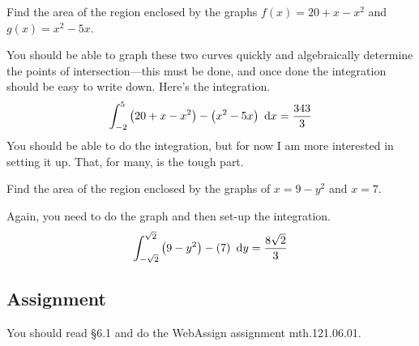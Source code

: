 \documentclass[12pt,addpoints, answers, fleqn]{exam}
\begin{document}
\begin{questions}
\question Find the area of the region enclosed by the graphs $f\left(x\right) = 20 + x - x^2$  and  $g\left(x\right) = x^2 - 5x$.
\begin{solution}
You should be able to graph these two curves quickly and algebraically determine the points of intersection---this must be done, and once done the integration should be easy to write down. Here's the integration.
\begin{eqnarray*}
\int_{-2}^5 \left(20 + x - x^2 \right) - \left(x^2-5x \right) \ {\rm{d}} x = \frac{343}{3}
\end{eqnarray*}
You should be able to do the integration, but for now I am more interested in setting it up. That, for many, is the tough part.
\end{solution}

\question Find the area of the region enclosed by the graphs of $x = 9 - y^2$ and $x = 7$.

\begin{solution}
Again, you need to do the graph and then set-up the integration.
\begin{eqnarray*}
\int_{-\sqrt{2}}^{\sqrt{2}} \left(9-y^2 \right) - \left(7 \right) \ {\rm{d}} y = \frac{8 \sqrt{2}}{3}
\end{eqnarray*}
\end{solution}

\end{questions}

\subsection{Assignment}
You should read \S  6.1 and do the WebAssign assignment mth.121.06.01.
\vfill
\pagebreak
\end{document}
